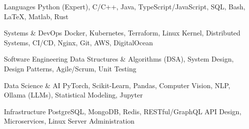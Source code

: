 

\begin{cvskills}

  \cvskill
    {Languages}
    {Python (Expert), C/C++, Java, TypeScript/JavaScript, SQL, Bash, LaTeX, Matlab, Rust}

  \cvskill
    {Systems \& DevOps}
    {Docker, Kubernetes, Terraform, Linux Kernel, Distributed Systems, CI/CD, Nginx, Git, AWS, DigitalOcean}

  \cvskill
    {Software Engineering}
    {Data Structures \& Algorithms (DSA), System Design, Design Patterns, Agile/Scrum, Unit Testing}

  \cvskill
    {Data Science \& AI}
    {PyTorch, Scikit-Learn, Pandas, Computer Vision, NLP, Ollama (LLMs), Statistical Modeling, Jupyter}

  \cvskill
    {Infrastructure}
    {PostgreSQL, MongoDB, Redis, RESTful/GraphQL API Design, Microservices, Linux Server Administration}


\end{cvskills}
